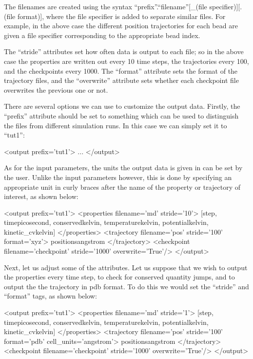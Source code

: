 \documentclass[11pt,english,fleqn]{report}
\newenvironment{code}{%
\footnotesize 
\verbatim
}{
\endverbatim
\normalsize
}
\begin{document}
The filenames are created using the syntax 
{}``prefix''.{}``filename''[\_(file specifier)][.(file format)], where the file specifier is
added to separate similar files. For example, in the above case the 
different position trajectories for each bead are given a file specifier
corresponding to the appropriate bead index.

The {}``stride'' attributes set how often data is output to each file;
so in the above case the properties are written out every 10 time steps,
the trajectories every 100, and the checkpoints every 1000.
The {}``format'' attribute sets the format of the trajectory files,
and the {}``overwrite'' attribute sets whether each checkpoint file 
overwrites the previous one or not.

There are several options we can use to customize the
output data. Firstly, the {}``prefix'' attribute should be set to
something which can be used to distinguish the files from different
simulation runs. In this case we can simply set it to {}``tut1'':

\begin{code}
<output prefix='tut1'>
   ...
</output>
\end{code}

As for the input parameters, the units the output data is given in can be
set by the user. Unlike the input parameters however, 
this is done by specifying an
appropriate unit in curly braces after the name of the 
property or trajectory of interest, as shown below:

\begin{code}
<output prefix='tut1'>
   <properties filename='md' stride='10'>
      [step, time{picosecond}, conserved{kelvin}, 
       temperature{kelvin}, potential{kelvin}, kinetic_cv{kelvin}] 
   </properties>
   <trajectory filename='pos' stride='100' format='xyz'>
      positions{angstrom} 
   </trajectory>
   <checkpoint filename='checkpoint' stride='1000' overwrite='True'/>
</output>
\end{code}

Next, let us adjust some of the attributes. Let us suppose that we
wish to output the properties every time step, to check for conserved
quantity jumps, and to output the the trajectory in pdb format.
To do this we would set the {}``stride'' and {}``format'' tags,
as shown below:

\begin{code}
<output prefix='tut1'>
   <properties filename='md' stride='1'>
      [step, time{picosecond}, conserved{kelvin}, 
       temperature{kelvin}, potential{kelvin}, kinetic_cv{kelvin}] 
   </properties>
   <trajectory filename='pos' stride='100' format='pdb' cell_units='angstrom'>
      positions{angstrom} 
   </trajectory>
   <checkpoint filename='checkpoint' stride='1000' overwrite='True'/>
</output>
\end{code}
\end{document}
